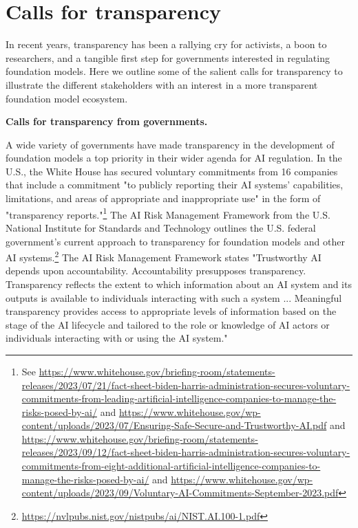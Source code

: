 \hypertarget{transparency-app}{\section{Calls for transparency}}
\label{app:transparency}

In recent years, transparency has been a rallying cry for activists, a boon to researchers, and a tangible first step for governments interested in regulating foundation models. Here we outline some of the salient calls for transparency to illustrate the different stakeholders with an interest in a more transparent foundation model ecosystem.

\textbf{Calls for transparency from governments.}

A wide variety of governments have made transparency in the development of foundation models a top priority in their wider agenda for AI regulation. 
In the U.S., the White House has secured voluntary commitments from 16 companies that include a commitment "to publicly reporting their AI systems’ capabilities, limitations, and areas of appropriate and inappropriate use" in the form of "transparency reports."\footnote{See \url{https://www.whitehouse.gov/briefing-room/statements-releases/2023/07/21/fact-sheet-biden-harris-administration-secures-voluntary-commitments-from-leading-artificial-intelligence-companies-to-manage-the-risks-posed-by-ai/} and \url{https://www.whitehouse.gov/wp-content/uploads/2023/07/Ensuring-Safe-Secure-and-Trustworthy-AI.pdf} and \url{https://www.whitehouse.gov/briefing-room/statements-releases/2023/09/12/fact-sheet-biden-harris-administration-secures-voluntary-commitments-from-eight-additional-artificial-intelligence-companies-to-manage-the-risks-posed-by-ai/} and \url{https://www.whitehouse.gov/wp-content/uploads/2023/09/Voluntary-AI-Commitments-September-2023.pdf}} 
The AI Risk Management Framework from the U.S. National Institute for Standards and Technology outlines the U.S. federal government’s current approach to transparency for foundation models and other AI systems.\footnote{\url{https://nvlpubs.nist.gov/nistpubs/ai/NIST.AI.100-1.pdf}}
The AI Risk Management Framework states "Trustworthy AI depends upon accountability. Accountability presupposes transparency. Transparency reflects the extent to which information about an AI system and its outputs is available to individuals interacting with such a system ... Meaningful transparency provides access to appropriate levels of information based on the stage of the AI lifecycle and tailored to the role or knowledge of AI actors or individuals interacting with or using the AI system." 


